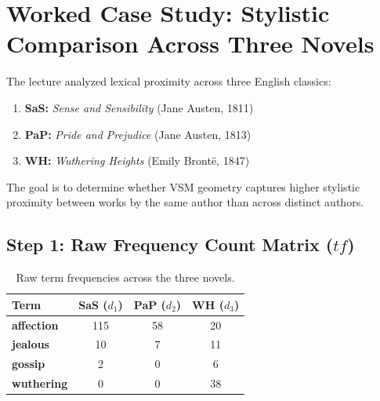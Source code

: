 \FloatBarrier
\section{Worked Case Study: Stylistic Comparison Across Three Novels}
\label{sec:three-novels-exercise-en}

The lecture analyzed lexical proximity across three English classics:
\begin{enumerate}
    \item \textbf{SaS:} \textit{Sense and Sensibility} (Jane Austen, 1811)
    \item \textbf{PaP:} \textit{Pride and Prejudice} (Jane Austen, 1813)
    \item \textbf{WH:} \textit{Wuthering Heights} (Emily Bront\"e, 1847)
\end{enumerate}
The goal is to determine whether VSM geometry captures higher stylistic proximity between works by the same author than across distinct authors.

\subsection[Step 1: Raw Frequency Count Matrix]{Step 1: Raw Frequency Count Matrix ($tf$)}

\begin{table}[H]
\centering
\begin{tabular}{l ccc}
\toprule
\textbf{Term} & \textbf{SaS ($d_1$)} & \textbf{PaP ($d_2$)} & \textbf{WH ($d_3$)} \\
\midrule
\textbf{affection} & 115 & 58 & 20 \\
\textbf{jealous}   & 10  & 7  & 11 \\
\textbf{gossip}    & 2   & 0  & 6  \\
\textbf{wuthering} & 0   & 0  & 38 \\
\bottomrule
\end{tabular}
\caption{Raw term frequencies across the three novels.}
\label{tab:novels-raw-en}
\end{table}

